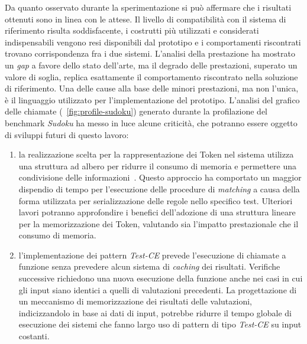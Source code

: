 Da quanto osservato durante la sperimentazione si può affermare che i risultati ottenuti sono in linea con le attese. Il livello di compatibilità con il sistema di riferimento risulta soddisfacente, i costrutti più utilizzati e considerati indispensabili vengono resi disponibili dal prototipo e i comportamenti riscontrati trovano corrispondenza fra i due sistemi. L'analisi della prestazione ha mostrato un \emph{gap} a favore dello stato dell'arte, ma il degrado delle prestazioni, superato un valore di soglia, replica esattamente il comportamento riscontrato nella soluzione di riferimento. Una delle cause alla base delle minori prestazioni, ma non l'unica, è il linguaggio utilizzato per l'implementazione del prototipo. L'analisi del grafico delle chiamate (\figurename~\ref{fig:profile-sudoku}) generato durante la profilazione del benchmark \emph{Sudoku} ha messo in luce alcune criticità, che potranno essere oggetto di sviluppi futuri di questo lavoro:
\begin{enumerate}
	\item la realizzazione scelta per la rappresentazione dei Token nel sistema utilizza una struttura ad albero per ridurre il consumo di memoria e permettere una condivisione delle informazioni~\cite{Doorenbos95productionmatching}. Questo approccio ha comportato un maggior dispendio di tempo per l'esecuzione delle procedure di \emph{matching} a causa della forma utilizzata per serializzazione delle regole nello specifico test. Ulteriori lavori potranno approfondire i benefici dell'adozione di una struttura lineare~\cite{Doorenbos95productionmatching} per la memorizzazione dei Token, valutando sia l'impatto prestazionale che il consumo di memoria.
	
	\item l'implementazione dei pattern \emph{Test-CE} prevede l'esecuzione di chiamate a funzione senza prevedere alcun sistema di \emph{caching} dei risultati. Verifiche successive richiedono una nuova esecuzione della funzione anche nei casi in cui gli input siano identici a quelli di valutazioni precedenti. La progettazione di un meccanismo di memorizzazione dei risultati delle valutazioni, indicizzandolo in base ai dati di input, potrebbe ridurre il tempo globale di esecuzione dei sistemi che fanno largo uso di pattern di tipo \emph{Test-CE} su input costanti.
\end{enumerate}





